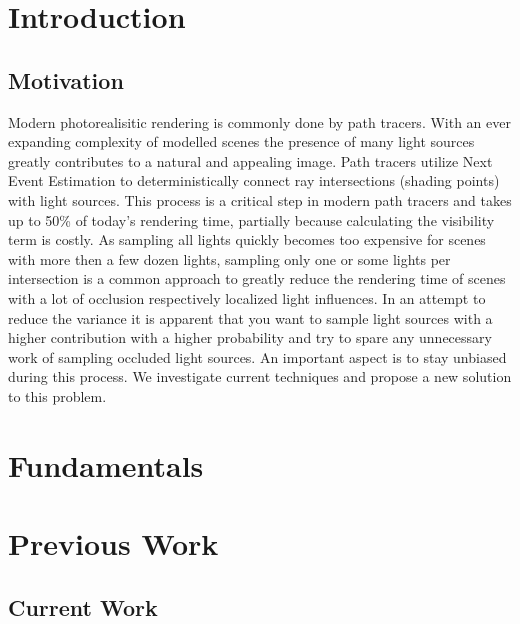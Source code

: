 
\chapter{Introduction}
\label{ch:Introduction}

\section{Motivation}

Modern photorealisitic rendering is commonly done by path tracers. With an ever expanding complexity of modelled scenes the presence of many light sources greatly contributes to a natural and appealing image. Path tracers utilize Next Event Estimation to deterministically connect ray intersections (shading points) with light sources. This process is a critical step in modern path tracers and takes up to 50\% of today's rendering time, partially because calculating the visibility term is costly. As sampling all lights quickly becomes too expensive for scenes with more then a few dozen lights, sampling only one or some lights per intersection is a common approach to greatly reduce the rendering time of scenes with a lot of occlusion respectively localized light influences. In an attempt to reduce the variance it is apparent that you want to sample light sources with a higher contribution with a higher probability and try to spare any unnecessary work of sampling occluded light sources. An important aspect is to stay unbiased during this process. We investigate current techniques and propose a new solution to this problem.


\chapter{Fundamentals}
\label{ch:Fundamentals}

\chapter{Previous Work}
\label{ch:Prev}

\section{Current Work}

